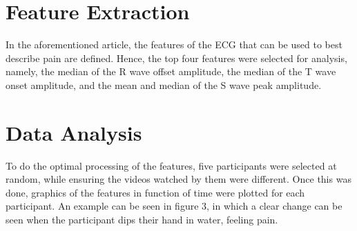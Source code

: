 \section{Feature Extraction}
In the aforementioned article, the features of the ECG that can be used to best describe pain are defined.
Hence, the top four features were selected for analysis, namely, the median of the R wave offset amplitude, the median of the T wave onset amplitude, and the mean and median of the S wave peak amplitude.



\section{Data Analysis}
To do the optimal processing of the features, five participants were selected at random, while ensuring the videos watched by them were different. 
Once this was done, graphics of the features in function of time were plotted for each participant. 
An example can be seen in figure 3, in which a clear change can be seen when the participant dips their hand in water, feeling pain. 









